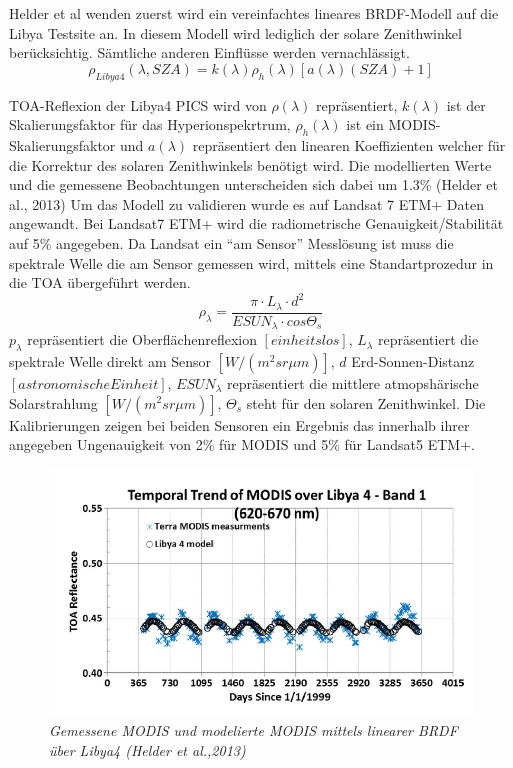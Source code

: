\documentclass[11pt]{report}
\begin{document}
Helder et al wenden zuerst wird ein vereinfachtes lineares BRDF-Modell auf die Libya Testsite an. In diesem Modell wird lediglich der solare Zenithwinkel berücksichtig. Sämtliche anderen Einflüsse werden vernachlässigt.
\begin{equation}
\rho_{Libya4}(\lambda,SZA) = k(\lambda)\rho_h(\lambda)\left[a(\lambda)(SZA)+1\right]
\end{equation}

TOA-Reflexion der Libya4 PICS wird von $\rho(\lambda)$ repräsentiert, $k(\lambda)$ ist der Skalierungsfaktor für das Hyperionspekrtrum, $\rho_h(\lambda)$ ist ein MODIS-Skalierungsfaktor und $a(\lambda)$ repräsentiert den linearen Koeffizienten welcher für die Korrektur des solaren Zenithwinkels benötigt wird.
Die modellierten Werte und die gemessene Beobachtungen unterscheiden sich dabei um 1.3\% (Helder et al., 2013)
Um das Modell zu validieren wurde es auf Landsat 7 ETM+ Daten angewandt. Bei Landsat7 ETM+ wird die radiometrische Genauigkeit/Stabilität auf 5\% angegeben. Da Landsat ein "`am Sensor"' Messlösung ist muss die spektrale Welle die am Sensor gemessen wird, mittels eine Standartprozedur in die TOA übergeführt werden.
\begin{equation}
\rho_\lambda=\frac{\pi\cdot L_\lambda\cdot d^2}{ESUN_\lambda \cdot cos\Theta_s}
\end{equation}
$p_\lambda$ repräsentiert die Oberflächenreflexion $\left[einheitslos\right]$, $L_\lambda$ repräsentiert die spektrale Welle direkt am Sensor $\left[W/(m^2sr\mu m)\right]$, $d$ Erd-Sonnen-Distanz $\left[astronomische Einheit\right]$, $ESUN_\lambda$ repräsentiert die mittlere atmopshärische Solarstrahlung $\left[W/(m^2sr\mu m)\right]$, $\Theta_s$ steht für den solaren Zenithwinkel.
Die Kalibrierungen zeigen bei beiden Sensoren ein Ergebnis das innerhalb ihrer angegeben Ungenauigkeit von 2\% für MODIS und 5\% für Landsat5 ETM+.

\begin{figure}[H]
\centering
\includegraphics[scale=0.6]{./Grafiken/Abscal/modellierte_gmessene_MODIS_mittels_lin_BRDF_Libya4.PNG}
\caption{\textit{Gemessene MODIS und modelierte MODIS mittels linearer BRDF über Libya4  (Helder et al.,2013)}}
\end{figure}
\end{document}
